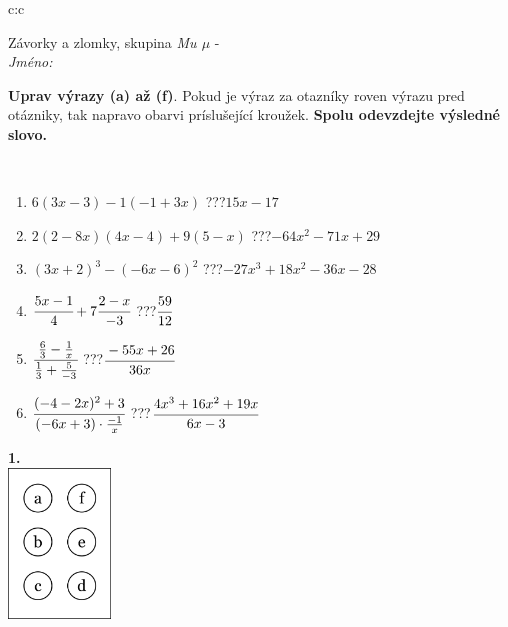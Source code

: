\documentclass[10pt]{report}
\begin{document}
\begin{tabular}{c:c}
\begin{minipage}[c][104.5mm][t]{0.5\linewidth}
\begin{center}
\vspace{7mm}
{\huge Závorky a zlomky, skupina \textit{Mu $\mu$} -}\\[5mm]
\textit{Jméno:}\phantom{xxxxxxxxxxxxxxxxxxxxxxxxxxxxxxxxxxxxxxxxxxxxxxxxxxxxxxxxxxxxxxxxx}\\[5mm]
\begin{minipage}{0.95\linewidth}
\begin{center}
\textbf{Uprav výrazy (a) až (f)}. Pokud je výraz za otazníky roven výrazu pred otázniky, tak napravo obarvi príslušející kroužek. \textbf{Spolu odevzdejte výsledné slovo.}
\end{center}
\end{minipage}
\\[1mm]
\begin{minipage}{0.79\linewidth}
\begin{center}
\begin{varwidth}{\linewidth}
\begin{enumerate}
\normalsize
\item $6(3x-3)-1(-1+3x)$\quad \dotfill\; ???\;\dotfill \quad $15x-17$
\item $2(2-8x)(4x-4)+9(5-x)$\quad \dotfill\; ???\;\dotfill \quad $-64x^2-71x+29$
\item $(3x+2)^3-(-6x-6)^2$\quad \dotfill\; ???\;\dotfill \quad $-27x^3+18x^2-36x-28$
\item $\cfrac{5x-1}{4}+7\cfrac{2-x}{-3}$\quad \dotfill\; ???\;\dotfill \quad $\cfrac{59}{12}$
\item $\cfrac{\frac{6}{3}-\frac{1}{x}}{\frac{1}{3}+\frac{5}{-3}}$\quad \dotfill\; ???\;\dotfill \quad $\cfrac{-55x+26}{36x}$
\item $\cfrac{(-4-2x)^2+3}{(-6x+3)\cdot\frac{-1}{x}}$\quad \dotfill\; ???\;\dotfill \quad $\cfrac{4x^3+16x^2+19x}{6x-3}$
\end{enumerate}
\end{varwidth}
\end{center}
\end{minipage}
\begin{minipage}{0.20\linewidth}
\begin{center}
{\Huge\bfseries 1.} \\[2mm]
\includegraphics[height=40mm]{../images/braille.png}

\end{center}
\end{minipage}
\end{center}
\end{minipage}
\end{tabular}
\end{document}
